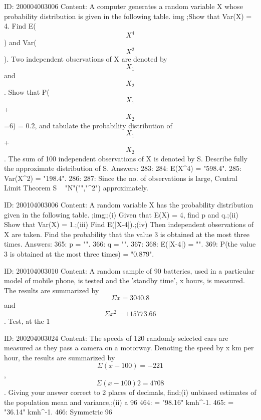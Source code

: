 \documentclass{article}
\begin{document}
ID: 200004003006
Content:
A computer generates a random variable X whose probability distribution is given in the following table. img ;Show that Var(X) = 4. Find E($$X^4$$) and Var($$X^2$$). Two independent observations of X are denoted by $$X_1$$ and $$X_2$$. Show that P($$X_1$$+$$X_2$$ =6) = 0.2, and tabulate the probability distribution of $$X_1$$+ $$X_2$$. The sum of 100 independent observations of X is denoted by S. Describe fully the approximate distribution of S.  Answers:
283: 
284: E(X^4) = "598.4".
285: Var(X^2) = "198.4".
286: 
287: Since the no. of observations is large, Central Limit Theorem \Rightarrow S ~ "N"("\mu","\sigma^{2}") approximately.

ID: 200104003006
Content:
A random variable X has the probability distribution given in the following table. ;img;;(i) Given that E(X) = 4, find p and q.;(ii) Show that Var(X) = 1.;(iii) Find E(|X-4|).;(iv) Then independent observations of X are taken. Find the probability that the value 3 is obtained at the most three times.  Answers:
365: p = "".
366: q = "".
367: 
368: E(|X-4|) = "".
369: P(the value 3 is obtained at the most three times) = "0.879".

ID: 200104003010
Content:
A random sample of 90 batteries, used in a particular model of mobile phone, is tested and the 'standby time', x hours, is measured. The results are summarized by $$\Sigma x=3040.8$$ and $$\Sigma x^2 = 115773.66$$. Test, at the 1%

ID: 200204003024
Content:
The speeds of 120 randomly selected cars are measured as they pass a camera on a motorway. Denoting the speed by x km per hour, the results are summarized by $$\Sigma (x-100) = -221$$, $$\Sigma (x-100)2=4708$$. Giving your answer correct to 2 places of decimals, find;(i) unbiased estimates of the population mean and variance,;(ii) a 96%
464: \hat{\mu} = "98.16" kmh^{-1}.
465: \hat{\sigma} = "36.14" kmh^{-1}.
466: Symmetric 96%
\end{document}
